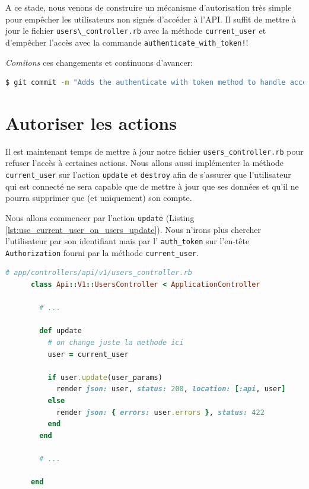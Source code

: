\documentclass[]{report}
\begin{document}
    A ce stade, nous venons de construire un mécanisme d'autorisation très simple pour empêcher les utilisateurs non signés d'accéder à l'API. Il suffit de mettre à jour le fichier \verb|users\_controller.rb| avec la méthode \verb|current_user| et d'empêcher l'accès avec la commande \verb|authenticate_with_token!|!

    \textit{Comitons} ces changements et continuons d'avancer:

    \begin{scriptsize}
      \begin{lstlisting}[language=bash]
      $ git commit -m "Adds the authenticate with token method to handle access to actions"
      \end{lstlisting}
    \end{scriptsize}

  \section{Autoriser les actions}

    Il est maintenant temps de mettre à jour notre fichier \verb|users_controller.rb| pour refuser l'accès à certaines actions. Nous allons aussi implémenter la méthode \verb|current_user| sur l'action \verb|update| et \verb|destroy| afin de s'assurer que l'utilisateur qui est connecté ne sera capable que de mettre à jour que ses données et qu'il ne pourra supprimer que (et uniquement) son compte.

    Nous allons commencer par l'action \verb|update| (Listing \ref{lst:use_current_user_on_users_update}). Nous n'irons plus chercher l'utilisateur par son identifiant mais par l' \verb|auth_token| sur l'en-tête \verb|Authorization| fourni par la méthode \verb|current_user|.

    \begin{scriptsize}
      \begin{lstlisting}[language=ruby, label={lst:use_current_user_on_users_update}, caption={Utilisation de la méthode current\_user pour l'action update}]
      # app/controllers/api/v1/users_controller.rb
      class Api::V1::UsersController < ApplicationController

        # ...

        def update
          # on change juste la methode ici
          user = current_user

          if user.update(user_params)
            render json: user, status: 200, location: [:api, user]
          else
            render json: { errors: user.errors }, status: 422
          end
        end

        # ...

      end
      \end{lstlisting}
    \end{scriptsize}
\end{document}
